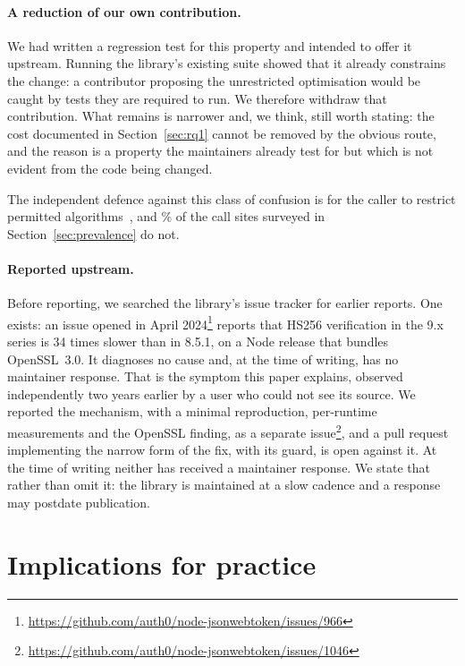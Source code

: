 \documentclass[pdflatex,sn-basic,twocolumn]{sn-jnl}%
\begin{document}
\paragraph{A reduction of our own contribution.} We had written a regression test
for this property and intended to offer it upstream. Running the library's
existing suite showed that it already constrains the change: a contributor
proposing the unrestricted optimisation would be caught by tests they are
required to run. We therefore withdraw that contribution. What remains is
narrower and, we think, still worth stating: the cost documented in
Section~\ref{sec:rq1} cannot be removed by the obvious route, and the reason is a
property the maintainers already test for but which is not evident from the code
being changed.

The independent defence against this class of confusion is for the caller to
restrict permitted algorithms~\citep{rfc8725}, and \SampleNoAlgorithmsPct\% of the
call sites surveyed in Section~\ref{sec:prevalence} do not.

\paragraph{Reported upstream.} Before reporting, we searched the library's issue
tracker for earlier reports. One exists: an issue opened in April
2024\footnote{\url{https://github.com/auth0/node-jsonwebtoken/issues/966}} reports that HS256 verification in the 9.x
series is 34 times slower than in 8.5.1, on a Node release that bundles
OpenSSL~3.0. It diagnoses no cause and, at the time of writing, has no
maintainer response. That is the symptom this paper explains, observed
independently two years earlier by a user who could not see its source. We
reported the mechanism, with a minimal reproduction, per-runtime measurements
and the OpenSSL finding, as a separate
issue\footnote{\url{https://github.com/auth0/node-jsonwebtoken/issues/1046}}, and
a pull request implementing the narrow form of the fix, with its guard, is open
against it.
At the time of writing neither has received a maintainer response. We
state that rather than omit it: the library is maintained at a slow cadence and
a response may postdate publication.

\section{Implications for practice}\label{sec:implications}
\end{document}
